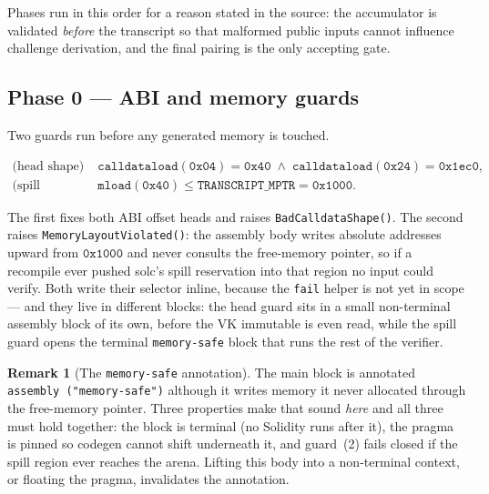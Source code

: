 \documentclass[11pt,a4paper]{article}
\newcommand{\code}[1]{\texttt{#1}}
\newcommand{\err}[1]{\textcolor{red!60!black}{\texttt{#1}}}
\newcommand{\mptr}[1]{\texttt{#1}}
\theoremstyle{definition}
\newtheorem{remark}{Remark}[section]
\begin{document}
\noindent
Phases run in this order for a reason stated in the source: the accumulator is
validated \emph{before} the transcript so that malformed public inputs cannot
influence challenge derivation, and the final pairing is the only accepting
gate.

\subsection{Phase 0 --- ABI and memory guards}

Two guards run before any generated memory is touched.

\begin{align}
\text{(head shape)}\quad
&\code{calldataload}(\mathtt{0x04}) = \mathtt{0x40}
\;\wedge\;
\code{calldataload}(\mathtt{0x24}) = \mathtt{0x1ec0},
\\[1mm]
\text{(spill separation)}\quad
&\code{mload}(\mathtt{0x40}) \le \mptr{TRANSCRIPT\_MPTR} = \mathtt{0x1000}.
\end{align}

The first fixes both ABI offset heads and raises \err{BadCalldataShape()}. The
second raises \err{MemoryLayoutViolated()}: the assembly body writes absolute
addresses upward from $\mathtt{0x1000}$ and never consults the free-memory
pointer, so if a recompile ever pushed solc's spill reservation into that
region no input could verify. Both write their selector inline, because the
\code{fail} helper is not yet in scope --- and they live in different blocks:
the head guard sits in a small non-terminal assembly block of its own, before
the VK immutable is even read, while the spill guard opens the terminal
\code{memory-safe} block that runs the rest of the verifier.

\begin{remark}[The \code{memory-safe} annotation]
The main block is annotated \code{assembly ("memory-safe")} although it writes
memory it never allocated through the free-memory pointer. Three properties
make that sound \emph{here} and all three must hold together: the block is
terminal (no Solidity runs after it), the pragma is pinned so codegen cannot
shift underneath it, and guard~(2) fails closed if the spill region ever
reaches the arena. Lifting this body into a non-terminal context, or floating
the pragma, invalidates the annotation.
\end{remark}
\end{document}
